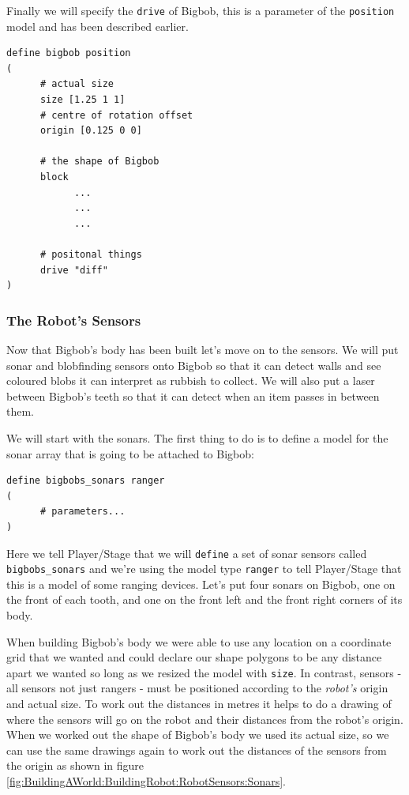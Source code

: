 \documentclass[a4paper]{report}
\newcommand{\plst}{Player/Stage\xspace}
\begin{document}
Finally we will specify the \verb|drive| of Bigbob, this is a parameter of the \verb|position| model and has been described earlier.
\begin{verbatim}
define bigbob position
(
      # actual size
      size [1.25 1 1]
      # centre of rotation offset
      origin [0.125 0 0]

      # the shape of Bigbob
      block
            ...
            ...
            ...
      
      # positonal things
      drive "diff"
)
\end{verbatim}


\subsubsection{The Robot's Sensors}\label{sec:BuildingAWorld:BuildingRobot:RobotSensors}
Now that Bigbob's body has been built let's move on to the sensors. We will put sonar and blobfinding sensors onto Bigbob so that it can detect walls and see coloured blobs it can interpret as rubbish to collect. We will also put a laser between Bigbob's teeth so that it can detect when an item passes in between them.

We will start with the sonars. The first thing to do is to define a model for the sonar array that is going to be attached to Bigbob:
\begin{verbatim}
define bigbobs_sonars ranger
(
      # parameters...
)
\end{verbatim}
Here we tell \plst that we will \verb|define| a set of sonar sensors called \verb|bigbobs_sonars| and we're using the model type \verb|ranger| to tell \plst that this is a model of some ranging devices. Let's put four sonars on Bigbob, one on the front of each tooth, and one on the front left and the front right corners of its body. 

When building Bigbob's body we were able to use any location on a coordinate grid that we wanted and could declare our shape polygons to be any distance apart we wanted so long as we resized the model with \verb|size|. In contrast, sensors - all sensors not just rangers - must be positioned according to the \emph{robot's} origin and actual size. To work out the distances in metres it helps to do a drawing of where the sensors will go on the robot and their distances from the robot's origin. When we worked out the shape of Bigbob's body we used its actual size, so we can use the same drawings again to work out the distances of the sensors from the origin as shown in figure \ref{fig:BuildingAWorld:BuildingRobot:RobotSensors:Sonars}.
\end{document}
